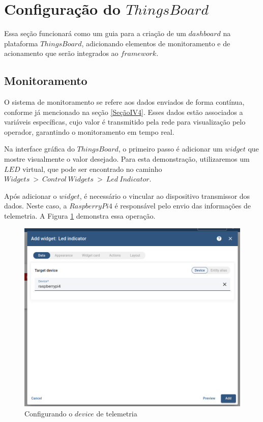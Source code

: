 \documentclass{ecatfg}
\begin{document}
\section{Configuração do $ThingsBoard$}

Essa seção funcionará como um guia para a criação de um $dashboard$ na plataforma $ThingsBoard$, adicionando elementos de monitoramento e de acionamento que serão integrados ao $framework$.\par

\subsection{Monitoramento}
O sistema de monitoramento se refere aos dados enviados de forma contínua, conforme já mencionado na seção \ref{SeçãoIV4}. Esses dados estão associados a variáveis específicas, cujo valor é transmitido pela rede para visualização pelo operador, garantindo o monitoramento em tempo real. \par

Na interface gráfica do $ThingsBoard$, o primeiro passo é adicionar um $widget$ que mostre visualmente o valor desejado. Para esta demonstração, utilizaremos um $LED$ virtual, que pode ser encontrado no caminho $Widgets\ >\ Control\ Widgets\ >\ Led\ Indicator$. \par

Após adicionar o $widget$, é necessário o vincular ao dispositivo transmissor dos dados. Neste caso, a $RaspberryPi4$ é responsável pelo envio das informações de telemetria. A Figura \ref{fig:7} demonstra essa operação. \par

\begin{figure}[!htb]
    \centering
    \includegraphics[scale=0.2]{Figuras/selecionando_device_thingsboard.png}
    \caption{Configurando o $device$ de telemetria}
    \label{fig:7}
\end{figure}
\end{document}
